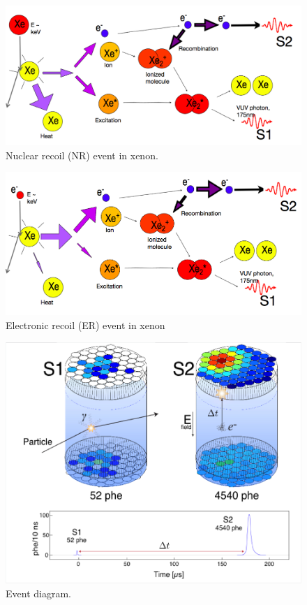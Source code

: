  \begin{figure}[h!]\centering
 \includegraphics[width=150mm]{Chapter_LUX_Det/NR_T_Shutt.png}
\caption{Nuclear recoil (NR) event in xenon.}
\label{fig:TomS_ER}
\end{figure}

 \begin{figure}[h!]\centering
\includegraphics[width=150mm]{Chapter_LUX_Det/ER_T_Shutt.png}
\caption{Electronic recoil (ER) event in xenon}
\label{fig:TomS_NR}
\end{figure}

 \begin{figure}[h!]\centering
\includegraphics[width=150mm]{Chapter_LUX_Det/LUX_Event_Diagram.png}
\caption{Event diagram.}
\label{fig:LUX_Event}
\end{figure}


